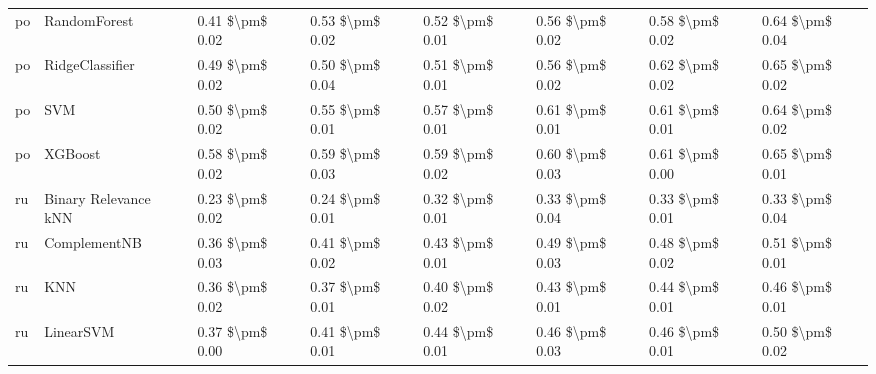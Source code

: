 \begin{tabular}{llllllll}
      po &                    RandomForest & 0.41 \$\textbackslash pm\$ 0.02 &           0.53 \$\textbackslash pm\$ 0.02 &       0.52 \$\textbackslash pm\$ 0.01 &        0.56 \$\textbackslash pm\$ 0.02 &                         0.58 \$\textbackslash pm\$ 0.02 &     0.64 \$\textbackslash pm\$ 0.04 \\
      po &                 RidgeClassifier & 0.49 \$\textbackslash pm\$ 0.02 &           0.50 \$\textbackslash pm\$ 0.04 &       0.51 \$\textbackslash pm\$ 0.01 &        0.56 \$\textbackslash pm\$ 0.02 &                         0.62 \$\textbackslash pm\$ 0.02 &     0.65 \$\textbackslash pm\$ 0.02 \\
      po &                             SVM & 0.50 \$\textbackslash pm\$ 0.02 &           0.55 \$\textbackslash pm\$ 0.01 &       0.57 \$\textbackslash pm\$ 0.01 &        0.61 \$\textbackslash pm\$ 0.01 &                         0.61 \$\textbackslash pm\$ 0.01 &     0.64 \$\textbackslash pm\$ 0.02 \\
      po &                         XGBoost & 0.58 \$\textbackslash pm\$ 0.02 &           0.59 \$\textbackslash pm\$ 0.03 &       0.59 \$\textbackslash pm\$ 0.02 &        0.60 \$\textbackslash pm\$ 0.03 &                         0.61 \$\textbackslash pm\$ 0.00 &     0.65 \$\textbackslash pm\$ 0.01 \\
      ru &            Binary Relevance kNN & 0.23 \$\textbackslash pm\$ 0.02 &           0.24 \$\textbackslash pm\$ 0.01 &       0.32 \$\textbackslash pm\$ 0.01 &        0.33 \$\textbackslash pm\$ 0.04 &                         0.33 \$\textbackslash pm\$ 0.01 &     0.33 \$\textbackslash pm\$ 0.04 \\
      ru &                    ComplementNB & 0.36 \$\textbackslash pm\$ 0.03 &           0.41 \$\textbackslash pm\$ 0.02 &       0.43 \$\textbackslash pm\$ 0.01 &        0.49 \$\textbackslash pm\$ 0.03 &                         0.48 \$\textbackslash pm\$ 0.02 &     0.51 \$\textbackslash pm\$ 0.01 \\
      ru &                             KNN & 0.36 \$\textbackslash pm\$ 0.02 &           0.37 \$\textbackslash pm\$ 0.01 &       0.40 \$\textbackslash pm\$ 0.02 &        0.43 \$\textbackslash pm\$ 0.01 &                         0.44 \$\textbackslash pm\$ 0.01 &     0.46 \$\textbackslash pm\$ 0.01 \\
      ru &                       LinearSVM & 0.37 \$\textbackslash pm\$ 0.00 &           0.41 \$\textbackslash pm\$ 0.01 &       0.44 \$\textbackslash pm\$ 0.01 &        0.46 \$\textbackslash pm\$ 0.03 &                         0.46 \$\textbackslash pm\$ 0.01 &     0.50 \$\textbackslash pm\$ 0.02 \\

\end{tabular}
